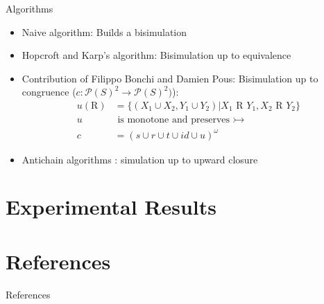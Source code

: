 \documentclass[compress]{beamer}
\begin{document}
\begin{frame}{Algorithms}
  \begin{itemize}
    \item Naive algorithm: Builds a bisimulation
    \item Hopcroft and Karp's algorithm\cite{hopcroft1971linear}: Bisimulation up to equivalence
    \item Contribution of Filippo Bonchi and Damien Pous\cite{bonchi2013checking}:
      Bisimulation up to congruence ($c : \mathcal{P}(S)^2 \to \mathcal{P}(S)^2)$):\\
        \begin{align}
          u(\text{R}) &= \{(X_1 \cup X_2, Y_1 \cup Y_2) | X_1 \text{ R } Y_1, X_2 \text{ R } Y_2\}\\
          u&\text{ is monotone and preserves }\rightarrowtail\\
          c &= (s \cup r \cup t \cup id \cup u)^\omega
        \end{align}
    \item Antichain algorithms
      \cite{doyen2010antichain}\cite{abdulla2010simulation}\cite{lengal2012vata}:
      simulation up to upward closure
  \end{itemize}
\end{frame}

\section{Experimental Results}



\section{References}

\begin{frame}[allowframebreaks]{References}
  
  
\end{frame}
\end{document}
